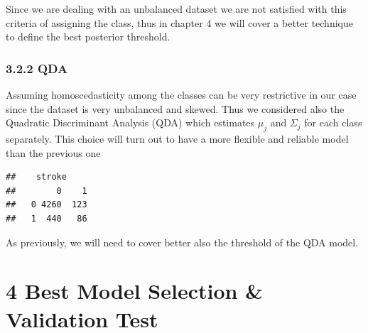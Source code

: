 \documentclass[
]{article}
\newenvironment{Shaded}{\begin{snugshade}}{\end{snugshade}}
\newcommand{\AttributeTok}[1]{\textcolor[rgb]{0.77,0.63,0.00}{#1}}
\newcommand{\DecValTok}[1]{\textcolor[rgb]{0.00,0.00,0.81}{#1}}
\newcommand{\FunctionTok}[1]{\textcolor[rgb]{0.00,0.00,0.00}{#1}}
\newcommand{\NormalTok}[1]{#1}
\newcommand{\OtherTok}[1]{\textcolor[rgb]{0.56,0.35,0.01}{#1}}
\newcommand{\SpecialCharTok}[1]{\textcolor[rgb]{0.00,0.00,0.00}{#1}}
\begin{document}
Since we are dealing with an unbalanced dataset we are not satisfied
with this criteria of assigning the class, thus in chapter 4 we will
cover a better technique to define the best posterior threshold.

\hypertarget{qda}{%
\subsubsection{3.2.2 QDA}\label{qda}}

Assuming homoscedasticity among the classes can be very restrictive in
our case since the dataset is very unbalanced and skewed. Thus we
considered also the Quadratic Discriminant Analysis (QDA) which
estimates \(\mu_j\) and \(\Sigma_j\) for each class separately. This
choice will turn out to have a more flexible and reliable model than the
previous one

\begin{Shaded}
\end{Shaded}

\begin{verbatim}
##    stroke
##        0    1
##   0 4260  123
##   1  440   86
\end{verbatim}

As previously, we will need to cover better also the threshold of the
QDA model.

\hypertarget{best-model-selection-validation-test}{%
\section{4 Best Model Selection \& Validation
Test}\label{best-model-selection-validation-test}}
\end{document}
